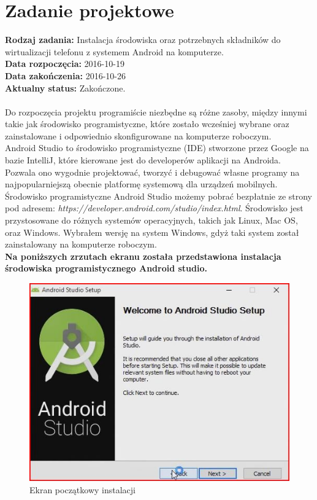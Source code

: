 \section{Zadanie projektowe}
\noindent\textbf{Rodzaj zadania:} Instalacja środowiska oraz potrzebnych składników do wirtualizacji telefonu z systemem Android na komputerze. \\

\noindent\textbf{Data rozpoczęcia:} 2016-10-19\\

\noindent\textbf{Data zakończenia:} 2016-10-26\\

\noindent\textbf{Aktualny status:} Zakończone.\\
\\

Do rozpoczęcia projektu programiście niezbędne są różne zasoby, między innymi takie jak środowisko programistyczne, które zostało wcześniej wybrane oraz zainstalowane i odpowiednio skonfigurowane na komputerze roboczym.
\\

Android Studio to środowisko programistyczne (IDE) stworzone przez Google na bazie IntelliJ, które kierowane jest do developerów aplikacji na Androida. Pozwala ono wygodnie projektować, tworzyć i debugować własne programy na najpopularniejszą obecnie platformę systemową dla urządzeń mobilnych.
\\

Środowisko programistyczne Android Studio możemy pobrać bezpłatnie ze strony pod adresem: \textit{https://developer.android.com/studio/index.html}. Środowisko jest przystosowane do różnych systemów operacyjnych, takich jak Linux, Mac OS, oraz Windows. Wybrałem wersję na system Windows, gdyż taki system został zainstalowany na komputerze roboczym.
\\


\textbf{Na poniższych zrzutach ekranu została przedstawiona instalacja środowiska programistycznego Android studio.}

\begin{figure}[h!]
\centering
\includegraphics[width=0.5\linewidth]{fig/i1}
\caption{Ekran początkowy instalacji}
\label{fig:11}
\end{figure}

